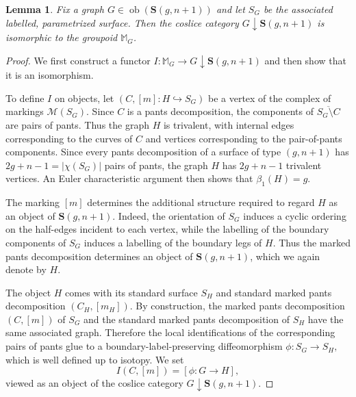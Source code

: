 \documentclass{amsart}
\newcommand{\bS}{\mathbf{S}}
\newcommand{\calM}{\mathcal{M}}
\newcommand{\id}{\operatorname{id}}
\newcommand{\ob}{\operatorname{ob}}
\newtheorem{lemma}[theorem]{Lemma}%
\theoremstyle{definition}
\numberwithin{equation}{section}
\begin{document}
\begin{lemma}\label{lemma: the complexes of morphisms and markings}
Fix a graph $G\in \ob(\bS(g,n+1))$ and let $S_G$ be the associated labelled, parametrized surface. Then the coslice category $G\downarrow \bS(g,n+1)$ is isomorphic to the groupoid $\mathbb{M}_G$.
\end{lemma}


\begin{proof}
We first construct a functor $I:\mathbb{M}_G\longrightarrow G\downarrow \bS(g,n+1)$ and then show that it is an isomorphism.

To define $I$ on objects,  let $(C,[m]:H\hookrightarrow S_G)$ be a vertex of the complex of markings $\calM(S_G)$. Since $C$ is a pants decomposition, the components of $\overline{S_G\setminus C}$ are pairs of pants. Thus the graph $H$ is trivalent, with internal edges corresponding to the curves of $C$ and vertices corresponding to the pair-of-pants
components. Since every pants decomposition of a surface of type $(g,n+1)$ has $2g+n-1 = |\chi(S_G)|$ pairs of pants, the graph $H$ has $2g+n-1$ trivalent vertices. An Euler characteristic argument then shows that $\beta_1(H)=g$.

The marking $[m]$ determines the additional structure required to regard $H$ as an object of $\bS(g,n+1)$. Indeed, the orientation of $S_G$ induces a cyclic ordering on the half-edges incident to each vertex, while the labelling of the boundary components of $S_G$ induces a labelling of the boundary legs of $H$. Thus the marked pants decomposition determines an object of $\bS(g,n+1)$, which we again denote by $H$.


The object $H$ comes with its standard surface $S_H$ and standard marked pants decomposition $(C_H,[m_H])$. By construction, the marked pants decomposition $(C,[m])$ of $S_G$ and the standard marked pants decomposition of $S_H$ have the same associated graph. Therefore the local identifications of the
corresponding pairs of pants glue to a boundary-label-preserving diffeomorphism $\phi:S_G\longrightarrow S_H,$ which is well defined up to isotopy. We set
\[
I(C,[m]) = [\phi:G\to H],
\]
viewed as an object of the coslice category $G\downarrow \bS(g,n+1)$.


\end{proof}
\end{document}
